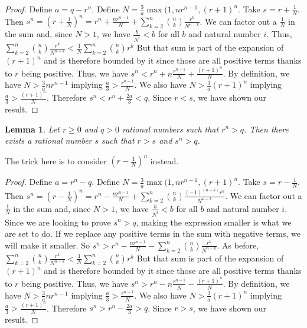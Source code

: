 \documentclass[12pt]{article}
\newtheorem{lemma}{Lemma}
\theoremstyle{remark}
\begin{document}
\begin{proof}
Define $a = q - r^n$. Define $N = \tfrac{3}{a} \max(1,n r^{n-1}, (r+1)^n$.  Take $s = r + \tfrac{1}{N}$. Then $s^n = (r+ \tfrac{1}{N})^n = r^n + \tfrac{n r^{n-1}}{N} + \sum_{k=2}^{n} \binom{n}{k} \tfrac{r^k}{N^{n-k}}$. We can factor out a $\tfrac{1}{N}$ in the sum and, since $N > 1$, we have $\tfrac{b}{N^i} < b$ for all $b$ and natural number $i$. Thus, $\sum_{k=2}^{n} \binom{n}{k} \tfrac{r^k}{N^{n-k}} < \tfrac{1}{N} \sum_{k=2}^{n} \binom{n}{k} r^k$  But that sum is part of the expansion of $(r+1)^n$ and is therefore bounded by it since those are all positive terms thanks to $r$ being positive. Thus, we have $s^n < r^n + n \tfrac{r^{n-1}}{N} + \tfrac{ (r+1)^n }{N}$.  By definition, we have $N > \tfrac{3}{a} n r^{n-1}$ implying $\tfrac{a}{3} > \tfrac{ r^{n-1}}{N}$. We also have $N > \tfrac{3}{a} (r+1)^n$ implying $\tfrac{a}{3} > \tfrac{(r+1)^n}{N}$. Therefore $s^n < r^n + \tfrac{2 a}{3} < q$. Since $r<s$, we have shown our result. 
\end{proof}

\begin{lemma}\label{app:greater}
Let $r \geq 0 $ and $q > 0$ rational numbers such that $r^n > q$. Then there exists a rational number $s$ such that $r > s$ and $s^n > q$.
\end{lemma}

The trick here is to consider $(r-\tfrac{1}{N})^n$ instead. 

\begin{proof}
Define $a = r^n - q$. Define $N = \tfrac{3}{a} \max(1,n r^{n-1}, (r+1)^n$.  Take $s = r - \tfrac{1}{N}$. Then $s^n = (r- \tfrac{1}{N})^n = r^n - \tfrac{n r^{n-1}}{N} + \sum_{k=2}^{n} \binom{n}{k} \tfrac{ (-1)^(n-k) r^k}{N^{n-k}}$. We can factor out a $\tfrac{1}{N}$ in the sum and, since $N > 1$, we have $\tfrac{b}{N^i} < b$ for all $b$ and natural number $i$. Since we are looking to prove $s^n > q$, making the expression smaller is what we are set to do. If we replace any positive terms in the sum with negative terms, we will make it smaller. So $s^n > r^n - \tfrac{n r^{n-1}}{N} - \sum_{k=2}^{n} \binom{n}{k} \tfrac{r^k}{N^{n-k}}$. As before, $\sum_{k=2}^{n} \binom{n}{k} \tfrac{r^k}{N^{n-k}} < \tfrac{1}{N} \sum_{k=2}^{n} \binom{n}{k} r^k$  But that sum is part of the expansion of $(r+1)^n$ and is therefore bounded by it since those are all positive terms thanks to $r$ being positive. Thus, we have $s^n > r^n - n \tfrac{r^{n-1}}{N} - \tfrac{ (r+1)^n }{N}$.  By definition, we have $N > \tfrac{3}{a} n r^{n-1}$ implying $\tfrac{a}{3} > \tfrac{ r^{n-1}}{N}$. We also have $N > \tfrac{3}{a} (r+1)^n$ implying $\tfrac{a}{3} > \tfrac{(r+1)^n}{N}$. Therefore $s^n > r^n - \tfrac{2 a}{3} > q$. Since $r>s$, we have shown our result. 
\end{proof}
\end{document}

